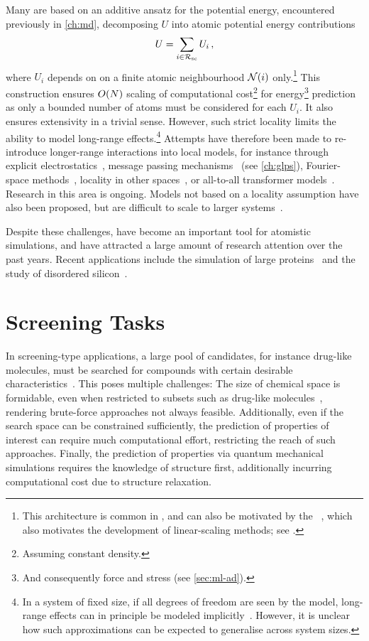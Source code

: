 Many \mlps are based on an additive ansatz for the potential energy, encountered previously in \cref{ch:md}, decomposing $U$ into atomic potential energy contributions
\begin{equation}
	U = \sum_{i \in \mathcal{R_{\text{sc}}}} U_i \, ,
\end{equation}
where $U_i$ depends on on a finite atomic neighbourhood $\mathcal{N}(i)$ only.\footnote{This architecture is common in \ffs, and can also be motivated by the ~\cite{pk2005p}, which also motivates the development of linear-scaling \dft methods; see \cite[ch.~18]{martin2020}.}
This construction ensures $O(N)$ scaling of computational cost\footnote{Assuming constant density.} for energy\footnote{And consequently force and stress (see \cref{sec:ml-ad}).} prediction as only a bounded number of atoms must be considered for each $U_i$. It also ensures extensivity in a trivial sense.
However, such strict locality limits the ability to model long-range effects.\footnote{In a system of fixed size, if all degrees of freedom are seen by the model, long-range effects can in principle be modeled implicitly~\cite{ctsm2017q}. However, it is unclear how such approximations can be expected to generalise across system sizes.}
Attempts have therefore been made to re-introduce longer-range interactions into local models, for instance through explicit electrostatics~\cite{b2021q}, message passing mechanisms~\cite{gsvd2017q} (see \cref{ch:glps}), Fourier-space methods~\cite{gc2019q,yhgx2022a}, locality in other spaces~\cite{fum2022q}, or all-to-all transformer models~\cite{ucsm2021q}. Research in this area is ongoing.
Models not based on a locality assumption have also been proposed, but are difficult to scale to larger systems~\cite{ctsm2017q,csmt2019q,sgmt2022q}.

Despite these challenges, \mlps have become an important tool for atomistic simulations, and have attracted a large amount of research attention over the past years. Recent applications include the simulation of large proteins~\cite{ustm2022a} and the study of disordered silicon~\cite{dbde2021q}.

\section{Screening Tasks}

In screening-type applications, a large pool of candidates, for instance drug-like molecules, must be searched for compounds with certain desirable characteristics~\cite{psaa2015p}. This poses multiple challenges: The size of chemical space is formidable, even when restricted to subsets such as drug-like molecules~\cite{pmv2013p}, rendering brute-force approaches not always feasible. Additionally, even if the search space can be constrained sufficiently, the prediction of properties of interest can require much computational effort, restricting the reach of such approaches. Finally, the prediction of properties via quantum mechanical simulations requires the knowledge of structure first, additionally incurring computational cost due to structure relaxation.

